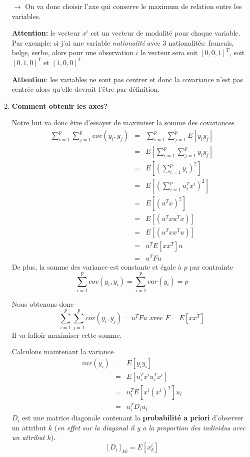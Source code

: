\documentclass[a4paper, 11pt, onecolumn]{article}
\begin{document}
\begin{enumerate}
$\rightarrow$ On va donc choisir l'axe qui conserve le maximum de relation entre les variables. 

\textbf{Attention:} le vecteur $x^i$ est un vecteur de modalité pour chaque variable. Par exemple: si j'ai une variable \textit{nationalité} avec 3 nationalités: francais, belge, serbe, alors pour une observation $i$ le vecteur sera soit $[0,0,1]^T$, soit $[0,1,0]^T$ et $[1,0,0]^T$

\textbf{Attention}: les variables ne sont pas centrer et donc la covariance n'est pas centrée alors qu'elle devrait l'être par définition.


\item \textbf{Comment obtenir les axes?}

\begin{framed}
Notre but va donc être d'essayer de maximiser la somme des covariances
\begin{eqnarray}
\sum_{i=1}^p\sum_{j=1}^pcov(y_i,y_j)&=&\sum_{i=1}^p\sum_{j=1}^pE[y_iy_j]\\
&=&E\left[\sum_{i=1}^p\sum_{j=1}^py_iy_j\right]\\
&=&E\left[(\sum_{i=1}^py_i)^2\right]\\
&=&E\left[(\sum_{i=1}^pu_i^Tx^i)^2\right]\\
&=&E\left[(u^Tx)^2\right]\\
&=&E\left[(u^Txu^Tx)\right]\\
&=&E\left[(u^Txx^Tu)\right]\\
&=&u^TE[xx^T]u\\
&=&u^TFu
\end{eqnarray}
De plus, la somme des variance est constante et égale à $p$ par contrainte
$$\sum_{i=1}^pcov(y_i,y_i) = \sum_{i=1}^pvar(y_i)=p$$
\end{framed}

Nous obtenons donc $$\sum_{i=1}^p\sum_{j=1}^pcov(y_i,y_j)=u^TFu  \textrm{ avec }  F=E[xx^T]$$ 
Il va falloir maximiser cette somme.

\begin{framed}
Calculons maintenant la variance
\begin{eqnarray}
var(y_i)&=&E[y_iy_i]\\
&=&E[u_i^Tx^iu_i^Tx^i]\\
&=&u_i^TE[x^i(x^i)^T]u_i\\
&=&u_i^TD_iu_i
\end{eqnarray}
$D_i$ est une matrice diagonale contenant la \textbf{probabilité a priori} d'observer un attribut $k$ (\textit{en effet sur la diagonal il y a la proportion des individus avec un attribut $k$}).
$$[D_i]_{kk}=E[x^i_k]$$
\end{framed}


\end{enumerate}
\end{document}
